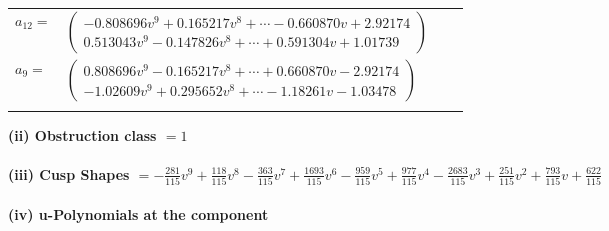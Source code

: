 \documentclass[1p]{elsarticle_modified}
\theoremstyle{definition}
\begin{document}
\begin{tabular}{m{7pt} m{180pt} m{7pt} m{180pt} }
\flushright $a_{12}=$&$\begin{pmatrix}-0.808696 v^{9}+0.165217 v^{8}+\cdots-0.660870 v+2.92174\\0.513043 v^{9}-0.147826 v^{8}+\cdots+0.591304 v+1.01739\end{pmatrix}$ \\
\flushright $a_{9}=$&$\begin{pmatrix}0.808696 v^{9}-0.165217 v^{8}+\cdots+0.660870 v-2.92174\\-1.02609 v^{9}+0.295652 v^{8}+\cdots-1.18261 v-1.03478\end{pmatrix}$\\&\end{tabular}
\flushleft \textbf{(ii) Obstruction class $= 1$}\\~\\
\flushleft \textbf{(iii) Cusp Shapes $= -\frac{281}{115} v^9+\frac{118}{115} v^8-\frac{363}{115} v^7+\frac{1693}{115} v^6-\frac{959}{115} v^5+\frac{977}{115} v^4-\frac{2683}{115} v^3+\frac{251}{115} v^2+\frac{793}{115} v+\frac{622}{115}$}\\~\\
\newpage\renewcommand{\arraystretch}{1}
\flushleft \textbf{(iv) u-Polynomials at the component}\newline \\
\end{document}
